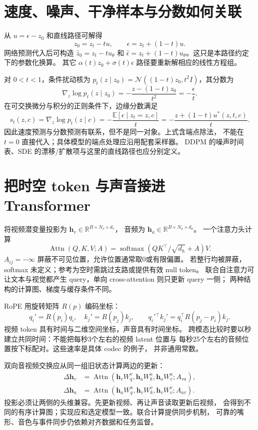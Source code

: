 \section{速度、噪声、干净样本与分数如何关联}

从 $u=\epsilon-z_0$ 和直线路径可解得
\[
z_0=z_t-tu,\qquad \epsilon=z_t+(1-t)u.
\]
网络预测代入后可构造 $\hat z_0=z_t-tu_\theta$ 和
$\hat\epsilon=z_t+(1-t)u_\theta$。这只是本路径约定下的参数化换算。
其它 $\alpha(t)z_0+\sigma(t)\epsilon$ 路径要重新解相应的线性方程组。

对 $0<t<1$，条件扰动核为
$p_t(z\mid z_0)=\mathcal N((1-t)z_0,t^2I)$，其分数为
\[
\nabla_z\log p_t(z\mid z_0)
=-\frac{z-(1-t)z_0}{t^2}=-\frac{\epsilon}{t}.
\]
在可交换微分与积分的正则条件下，边缘分数满足
\[
s_t(z,c)=\nabla_z\log p_t(z\mid c)
=-\frac{\mathbb E[\epsilon\mid z_t=z,c]}{t}
=-\frac{z+(1-t)u^*(z,t,c)}{t}.
\]
因此速度预测与分数预测有联系，但不是同一对象。上式含端点除法，
不能在 $t=0$ 直接代入；具体模型的端点处理应沿用配套采样器。
DDPM 的噪声时间表、SDE 的漂移/扩散项与这里的直线路径也应分别定义。

\section{把时空 token 与声音接进 Transformer}

将视频潜变量投影为 $\mathbf h_v\in\mathbb R^{B\times N_v\times d_v}$，
音频为 $\mathbf h_a\in\mathbb R^{B\times N_a\times d_a}$。
一个注意力头计算
\[
\operatorname{Attn}(Q,K,V;A)
=\operatorname{softmax}\!\left(QK^\top/\sqrt{d_h}+A\right)V.
\]
$A_{ij}=-\infty$ 屏蔽不可见位置，允许位置通常取0或有限偏置。
若整行均被屏蔽，softmax 未定义；参考为空时需跳过支路或提供有效 null token。
联合自注意力可让文本与视觉都产生 query，单向 cross-attention 则只更新 query 一侧；
两种结构的计算图、梯度与缓存条件不同。

RoPE 用旋转矩阵 $R(p)$ 编码坐标：
\[
q_i'=R(p_i)q_i,\quad k_j'=R(p_j)k_j,\qquad
q_i'{}^\top k_j'=q_i^\top R(p_j-p_i)k_j.
\]
视频 token 具有时间与二维空间坐标，声音具有时间坐标。
跨模态比较时要以秒建立共同时间：不能把每秒3个左右的视频 latent 位置与
每秒25个左右的音频位置按下标配对。这些速率是具体 codec 的例子，
并非通用常数。

双向音视频交换应从同一组旧状态计算两边的更新：
\[
\begin{aligned}
\Delta\mathbf h_v&=\operatorname{Attn}(\mathbf h_vW_q^v,\mathbf h_aW_k^a,\mathbf h_aW_v^a;A_{va}),\\
\Delta\mathbf h_a&=\operatorname{Attn}(\mathbf h_aW_q^a,\mathbf h_vW_k^v,\mathbf h_vW_v^v;A_{av}).
\end{aligned}
\]
投影必须让两侧的头维兼容。先更新视频、再让声音读取更新后视频，
会得到不同的有序计算图；实现应和选定模型一致。联合计算提供同步机制，
可靠的嘴形、音色与事件同步仍依赖对齐数据和任务监督。

